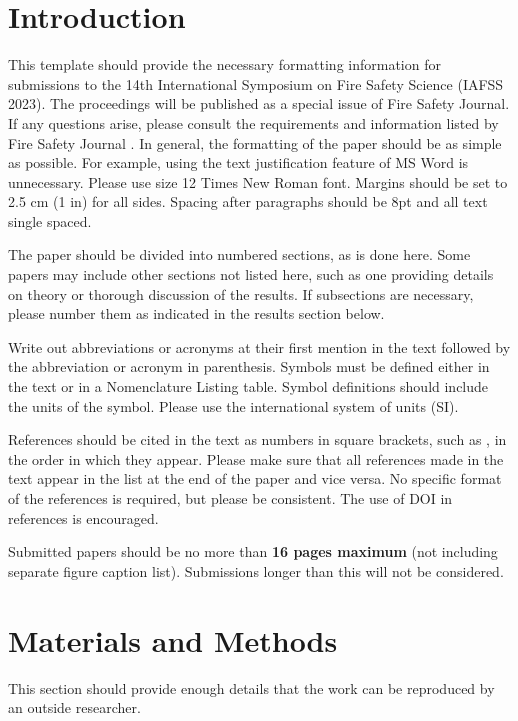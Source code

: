 \documentclass[fleqn,letterpaper,12pt]{article}
\begin{document}
\section{Introduction}

This template should provide the necessary formatting information for submissions to the 14th International Symposium on Fire Safety Science (IAFSS 2023).  The proceedings will be published as a special issue of Fire Safety Journal.  If any questions arise, please consult the requirements and information listed by Fire Safety Journal \cite{Example}.  In general, the formatting of the paper should be as simple as possible.  For example, using the text justification feature of MS Word is unnecessary.  Please use size 12 Times New Roman font.  Margins should be set to 2.5 cm (1 in) for all sides.  Spacing after paragraphs should be 8pt and all text single spaced.

The paper should be divided into numbered sections, as is done here.  Some papers may include other sections not listed here, such as one providing details on theory or thorough discussion of the results.  If subsections are necessary, please number them as indicated in the results section below.

Write out abbreviations or acronyms at their first mention in the text followed by the abbreviation or acronym in parenthesis.  Symbols must be defined either in the text or in a Nomenclature Listing table.  Symbol definitions should include the units of the symbol.  Please use the international system of units (SI).

References should be cited in the text as numbers in square brackets, such as \cite{Example}, in the order in which they appear.  Please make sure that all references made in the text appear in the list at the end of the paper and vice versa.  No specific format of the references is required, but please be consistent.  The use of DOI in references is encouraged. \nocite{Drysdale:1,Magnussen:1,SFPE:Beyler,Rehm:1}

Submitted papers should be no more than \textbf{16 pages maximum} (not including separate figure caption list).  Submissions longer than this will not be considered.

\section{Materials and Methods}

This section should provide enough details that the work can be reproduced by an outside researcher.  
\end{document}
